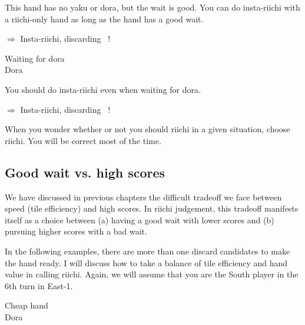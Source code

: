 \noindent This hand has no {\jap yaku} or {\jap dora}, but the wait is good. You can do insta-riichi with a riichi-only hand as long as the hand has a good wait. 

\begin{center}
{\Large $\Rightarrow$ Insta-riichi, discarding  ~!}
\end{center}


\bigskip
\begin{itembox}[r]{Waiting for {\jap dora}}
\bp
{}~~\\
\hfill\footnotesize{{\jap Dora}~~~~~~~}
\ep
\vspace{-15pt}
\end{itembox}

\noindent You should do insta-riichi even when waiting for {\jap dora}. 

\begin{center}
{\Large $\Rightarrow$ Insta-riichi, discarding  ~!}
\end{center}

\noindent When you wonder whether or not you should riichi in a given situation, choose riichi. You will be correct most of the time. 

\subsection{Good wait vs. high scores}
\bigskip
We have discussed in previous chapters the difficult tradeoff we face between speed (tile efficiency) and high scores. In riichi judgement, this tradeoff manifests itself as a choice between (a) having a good wait with lower scores and (b) pursuing higher scores with a bad wait.

\bigskip
In the following examples, there are more than one discard candidates to make the hand ready. I will discuss how to take a balance of tile efficiency and hand value in calling riichi. Again, we will assume that you are the South player in the 6th turn in East-1.

\bigskip
\begin{itembox}[r]{Cheap hand}
\bp
{}\bai\bai~~\bei\\
\hfill\footnotesize{{\jap Dora}~~~~~~~}
\ep
\vspace{-15pt}
\end{itembox}

